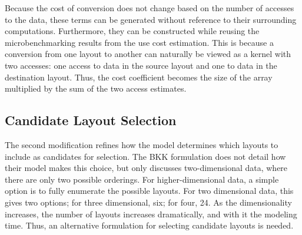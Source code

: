 \begin{comment}
	if (cache[normalizedLayoutOrder] != 0) {
		return cache[normalizedLayoutOrder];
	}

	idx_t n = pow(modelProblemSize, 1/2.0);

	//allocate memory and create Views
	double* data1 = new double[modelProblemSize];
	double* data2 = new double[modelProblemSize];
	View2D arr1(data1, normalizedLayoutOrder);
	View2D arr2(data2, normalizedLayoutOrder);

	//fill Views
	for(int i = 0; i < modelProblemSize; i++) {
		data1[i] = std::rand();
		data2[i] = std::rand();
	}

	using Policy = NestingPolicy<2>;

	auto lam = [=](auto i, auto j) {
	  arr2(i,j) = arr1(i,j);
	};
	auto segments = make_tuple(RangeSegment(0,n), RangeSegment(0,n));

	auto knl = make_kernel<Policy>(lam, segments);

	startTimer();
	knl();
	elapsed = stopTimer();

	cache[normalizedLayoutOrder] = elapsed;
	return cache[normalizedLayoutOrder];
}
\end{lstlisting}

\end{comment}
Because the cost of conversion does not change based on the number of accesses to the data, these terms can be generated without reference to their surrounding computations.
Furthermore, they can be constructed while reusing the microbenchmarking results from the use cost estimation.
This is because a conversion from one layout to another can naturally be viewed as a kernel with two accesses: one access to data in the source layout and one to data in the destination layout.
Thus, the cost coefficient becomes the size of the array multiplied by the sum of the two access estimates.


\subsection{Candidate Layout Selection}\label{sec:candidateSelection}

The second modification refines how the model determines which layouts to include as candidates for selection.
The BKK formulation does not detail how their model makes this choice, but only discusses two-dimensional data, where there are only two possible orderings.
For higher-dimensional data, a simple option is to fully enumerate the possible layouts.
For two dimensional data, this gives two options; for three dimensional, six; for four, 24.
As the dimensionality increases, the number of layouts increases dramatically, and with it the modeling time.
Thus, an alternative formulation for selecting candidate layouts is needed.


